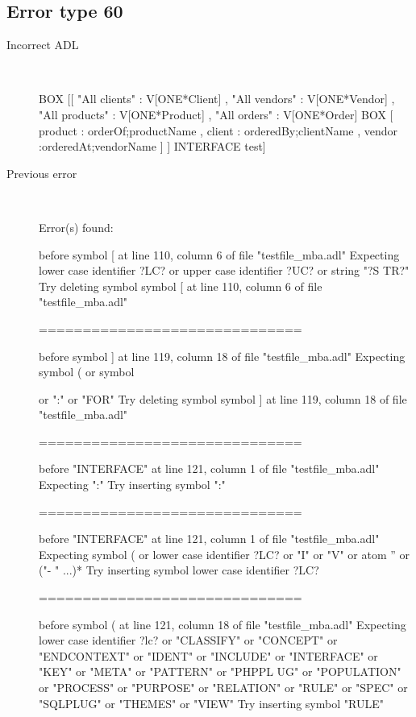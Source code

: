 \hrulefill

\subsection{Error type 60}
  \begin{description}
  \item[Incorrect ADL]~\\
\begin{adl}
BOX [[ "All clients"  : V[ONE*Client]
   , "All vendors"  : V[ONE*Vendor] 
   , "All products" : V[ONE*Product]
   , "All orders"   : V[ONE*Order]
     BOX [ product : orderOf;productName
         , client  : orderedBy;clientName
         , vendor  :orderedAt;vendorName
         ] 
   ]
   INTERFACE test]\end{adl}
  \item[Previous error]~\\
\begin{haskell}
Error(s) found:

before symbol [ at line 110, column 6 of file "testfile_mba.adl"
Expecting lower case identifier ?LC? or upper case identifier ?UC? or string "?S
TR?"
Try deleting symbol symbol [ at line 110, column 6 of file "testfile_mba.adl"

==============================

before symbol ] at line 119, column 18 of file "testfile_mba.adl"
Expecting symbol ( or symbol { or ":" or "FOR"
Try deleting symbol symbol ] at line 119, column 18 of file "testfile_mba.adl"

==============================

before "INTERFACE" at line 121, column 1 of file "testfile_mba.adl"
Expecting ":"
Try inserting symbol ":"

==============================

before "INTERFACE" at line 121, column 1 of file "testfile_mba.adl"
Expecting symbol ( or lower case identifier ?LC? or "I" or "V" or atom '' or ("-
" ...)*
Try inserting symbol lower case identifier ?LC?

==============================

before symbol ( at line 121, column 18 of file "testfile_mba.adl"
Expecting lower case identifier ?lc? or "CLASSIFY" or "CONCEPT" or "ENDCONTEXT"
or "IDENT" or "INCLUDE" or "INTERFACE" or "KEY" or "META" or "PATTERN" or "PHPPL
UG" or "POPULATION" or "PROCESS" or "PURPOSE" or "RELATION" or "RULE" or "SPEC"
or "SQLPLUG" or "THEMES" or "VIEW"
Try inserting symbol "RULE"

}
\end{haskell}
\end{description}
